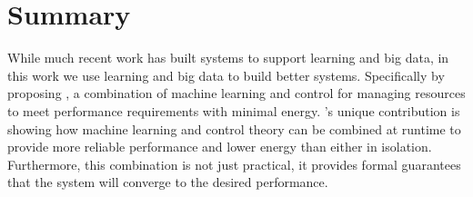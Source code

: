 \section{Summary}
While much recent work has built systems to support learning and big
data, in this work we use learning and big data to build better
systems.  Specifically by proposing \SYSTEM{}, a combination of
machine learning and control for managing resources to meet
performance requirements with minimal energy.  \SYSTEM{}'s unique
contribution is showing how machine learning and control theory can be
combined at runtime to provide more reliable performance and lower
energy than either in isolation.  Furthermore, this combination is not
just practical, it provides formal guarantees that the system will
converge to the desired performance.
